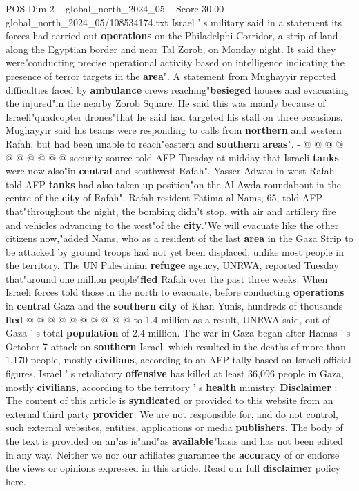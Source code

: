 \begin{textsample}{POS Dim 2 – global\_north\_2024\_05 – Score 30.00 – global\_north\_2024\_05/108534174.txt}
Israel ' s military said in a statement its forces had carried out \textbf{operations} on the Philadelphi Corridor, a strip of land along the Egyptian border and near Tal Zorob, on Monday night.
It said they were"conducting precise operational activity based on intelligence indicating the presence of terror targets in the \textbf{area}".
A statement from Mughayyir reported difficulties faced by \textbf{ambulance} crews reaching"\textbf{besieged} houses and evacuating the injured"in the nearby Zorob Square.
He said this was mainly because of Israeli"quadcopter drones"that he said had targeted his staff on three occasions.
Mughayyir said his teams were responding to calls from \textbf{northern} and western Rafah, but had been unable to reach"eastern and \textbf{southern} \textbf{areas}". - @ @ @ @ @ @ @ @ @ @ security source told AFP Tuesday at midday that Israeli \textbf{tanks} were now also"in \textbf{central} and southwest Rafah".
Yasser Adwan in west Rafah told AFP \textbf{tanks} had also taken up position"on the Al-Awda roundabout in the centre of the \textbf{city} of Rafah".
Rafah resident Fatima al-Nams, 65, told AFP that"throughout the night, the bombing didn't stop, with air and artillery fire and vehicles advancing to the west"of the \textbf{city}."We will evacuate like the other citizens now,"added Nams, who as a resident of the last \textbf{area} in the Gaza Strip to be attacked by ground troops had not yet been displaced, unlike most people in the territory.
The UN Palestinian \textbf{refugee} agency, UNRWA, reported Tuesday that"around one million people"\textbf{fled} Rafah over the past three weeks.
When Israeli forces told those in the north to evacuate, before conducting \textbf{operations} in \textbf{central} Gaza and the \textbf{southern} \textbf{city} of Khan Yunis, hundreds of thousands \textbf{fled} @ @ @ @ @ @ @ @ @ @ to 1.4 million as a result, UNRWA said, out of Gaza ' s total \textbf{population} of 2.4 million.
The war in Gaza began after Hamas ' s October 7 attack on \textbf{southern} Israel, which resulted in the deaths of more than 1,170 people, mostly \textbf{civilians}, according to an AFP tally based on Israeli official figures.
Israel ' s retaliatory \textbf{offensive} has killed at least 36,096 people in Gaza, mostly \textbf{civilians}, according to the territory ' s \textbf{health} ministry. \textbf{Disclaimer} : The content of this article is \textbf{syndicated} or provided to this website from an external third party \textbf{provider}.
We are not responsible for, and do not control, such external websites, entities, applications or media \textbf{publishers}.
The body of the text is provided on an"as is"and"as \textbf{available}"basis and has not been edited in any way.
Neither we nor our affiliates guarantee the \textbf{accuracy} of or endorse the views or opinions expressed in this article.
Read our full \textbf{disclaimer} policy here.


\end{textsample}

